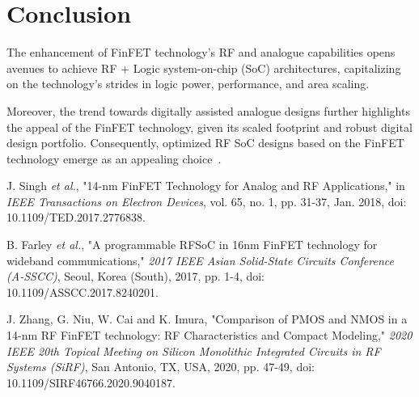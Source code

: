 \documentclass[11pt,a4paper]{article}
\begin{document}
    
    \section{Conclusion}

        The enhancement of FinFET technology's RF and analogue capabilities opens avenues to achieve RF + Logic system-on-chip (SoC) architectures, capitalizing on the technology's strides in logic power, performance, and area scaling.
        
        Moreover, the trend towards digitally assisted analogue designs further highlights the appeal of the FinFET technology, given its scaled footprint and robust digital design portfolio. Consequently, optimized RF SoC designs based on the FinFET technology emerge as an appealing choice~\cite{farley:programmable-rf-soc-in-16nm-finfet-technology-for-broadband-communications}.


    \begin{thebibliography}{20}

         J. Singh \emph{et al.}, "14-nm FinFET Technology for Analog and RF Applications," in \emph{IEEE Transactions on Electron Devices}, vol. 65, no. 1, pp. 31-37, Jan. 2018, doi: 10.1109/TED.2017.2776838.

         B. Farley \emph{et al.}, "A programmable RFSoC in 16nm FinFET technology for wideband communications," \emph{2017 IEEE Asian Solid-State Circuits Conference (A-SSCC)}, Seoul, Korea (South), 2017, pp. 1-4, doi: 10.1109/ASSCC.2017.8240201.

         J. Zhang, G. Niu, W. Cai and K. Imura, "Comparison of PMOS and NMOS in a 14-nm RF FinFET technology: RF Characteristics and Compact Modeling," \emph{2020 IEEE 20th Topical Meeting on Silicon Monolithic Integrated Circuits in RF Systems (SiRF)}, San Antonio, TX, USA, 2020, pp. 47-49, doi: 10.1109/SIRF46766.2020.9040187.
		
	\end{thebibliography}
\end{document}
